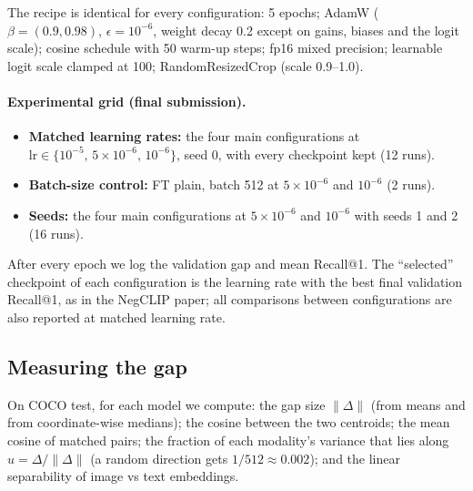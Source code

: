 \documentclass[11pt,a4paper]{article}
\newcommand{\uhat}{\hat{u}}
\newcommand{\gapv}{\Delta}
\begin{document}
The recipe is identical for every configuration: 5 epochs; AdamW ($\beta=(0.9,0.98)$, $\epsilon=10^{-6}$,
weight decay 0.2 except on gains, biases and the logit scale); cosine schedule with 50 warm-up steps;
fp16 mixed precision; learnable logit scale clamped at 100; RandomResizedCrop (scale 0.9--1.0).

\paragraph{Experimental grid (final submission).}
\begin{itemize}
\item \textbf{Matched learning rates:} the four main configurations at
$\text{lr}\in\{10^{-5},\,5\times10^{-6},\,10^{-6}\}$, seed 0, with every checkpoint kept (12 runs).
\item \textbf{Batch-size control:} FT plain, batch 512 at $5\times10^{-6}$ and $10^{-6}$ (2 runs).
\item \textbf{Seeds:} the four main configurations at $5\times10^{-6}$ and $10^{-6}$ with seeds 1 and 2
(16 runs).
\end{itemize}
After every epoch we log the validation gap and mean Recall@1. The ``selected'' checkpoint of each
configuration is the learning rate with the best final validation Recall@1, as in the NegCLIP paper;
all comparisons between configurations are also reported at matched learning rate.

\subsection{Measuring the gap}
On COCO test, for each model we compute: the gap size $\lVert\gapv\rVert$ (from means and from
coordinate-wise medians); the cosine between the two centroids; the mean cosine of matched pairs;
the fraction of each modality's variance that lies along $\uhat=\gapv/\lVert\gapv\rVert$ (a random
direction gets $1/512\approx0.002$); and the linear separability of image vs text embeddings.
\end{document}
